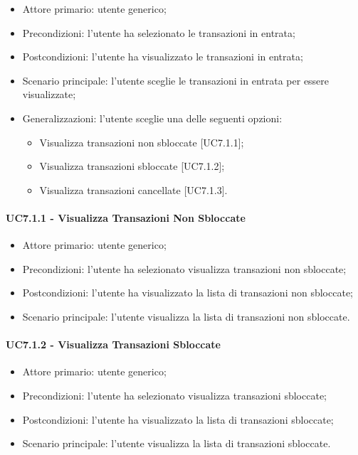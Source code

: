 \begin{itemize}
    \item Attore primario: utente generico;
    \item Precondizioni: l'utente ha selezionato le transazioni in entrata;
    \item Postcondizioni: l'utente ha visualizzato le transazioni in entrata;
    \item Scenario principale: l'utente sceglie le transazioni in entrata per essere visualizzate;
    \item Generalizzazioni: l'utente sceglie una delle seguenti opzioni:
          \begin{itemize}
              \item Visualizza transazioni non sbloccate [UC7.1.1];
              \item Visualizza transazioni sbloccate [UC7.1.2];
              \item Visualizza transazioni cancellate [UC7.1.3].
          \end{itemize}
\end{itemize}

\paragraph{UC7.1.1 - Visualizza Transazioni Non Sbloccate}

\begin{itemize}
    \item Attore primario: utente generico;
    \item Precondizioni: l'utente ha selezionato visualizza transazioni non sbloccate;
    \item Postcondizioni: l'utente ha visualizzato la lista di transazioni non sbloccate;
    \item Scenario principale: l'utente visualizza la lista di transazioni non sbloccate.
\end{itemize}

\paragraph{UC7.1.2 - Visualizza Transazioni Sbloccate}

\begin{itemize}
    \item Attore primario: utente generico;
    \item Precondizioni: l'utente ha selezionato visualizza transazioni sbloccate;
    \item Postcondizioni: l'utente ha visualizzato la lista di transazioni sbloccate;
    \item Scenario principale: l'utente visualizza la lista di transazioni sbloccate.
\end{itemize}

